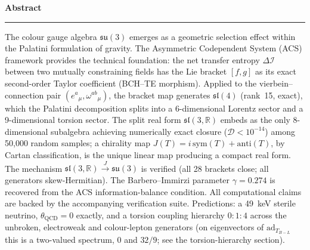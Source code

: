\documentclass[11pt,a4paper]{article}
\theoremstyle{plain}
\theoremstyle{definition}
\theoremstyle{remark}
\newcommand{\DI}{\Delta\mathcal{I}}
\begin{document}
\begin{titlepage}
\begin{center}
\begin{minipage}{0.88\textwidth}
\begin{center}
  {\bfseries\color{acsprimary}\large Abstract}\\[0.3em]
  {\color{acsrule}\rule{1.2in}{0.3pt}}
\end{center}
\vspace{0.5em}
\small\noindent
The colour gauge algebra $\mathfrak{su}(3)$ emerges as a geometric
selection effect within the Palatini formulation of gravity.  The
Asymmetric Codependent System (ACS) framework provides the technical
foundation: the net transfer entropy $\DI$ between two mutually
constraining fields has the Lie bracket $[f,g]$ as its exact second-order
Taylor coefficient (BCH--TE morphism).  Applied to the
vierbein--connection pair $(e^a{}_\mu,\omega^{ab}{}_\mu)$, the bracket
map generates $\mathfrak{sl}(4)$ (rank~15, exact), which the Palatini
decomposition splits into a 6-dimensional Lorentz sector and a
9-dimensional torsion sector.  The split real form $\mathfrak{sl}(3,\mathbb{R})$
embeds as the only 8-dimensional subalgebra achieving numerically exact
closure ($\mathcal{D}<10^{-14}$) among 50{,}000 random samples;
a chirality map $J(T) = i\,\mathrm{sym}(T) + \mathrm{anti}(T)$,
by Cartan classification, is the unique linear map producing a compact
real form.  The mechanism $\mathfrak{sl}(3,\mathbb{R}) \xrightarrow{J} \mathfrak{su}(3)$
is verified (all 28 brackets close; all generators skew-Hermitian).
The Barbero--Immirzi parameter $\gamma = 0.274$ is recovered from the
ACS information-balance condition.  All computational claims are backed
by the accompanying verification suite.  Predictions: a 49~keV sterile
neutrino, $\theta_{\mathrm{QCD}}=0$ exactly, and a torsion coupling
hierarchy $0{:}1{:}4$ across the unbroken, electroweak and colour-lepton
generators (on eigenvectors of $\mathrm{ad}_{T_{B-L}}$ this is a two-valued
spectrum, $0$ and $32/9$; see the torsion-hierarchy section).
\end{minipage}
\end{center}

\vfill

\noindent{\color{acsrule}\rule{\textwidth}{0.4pt}}
\end{titlepage}

\clearpage
{}
\setcounter{page}{1}

\tableofcontents
\clearpage
{}
\setcounter{page}{1}
\end{document}
